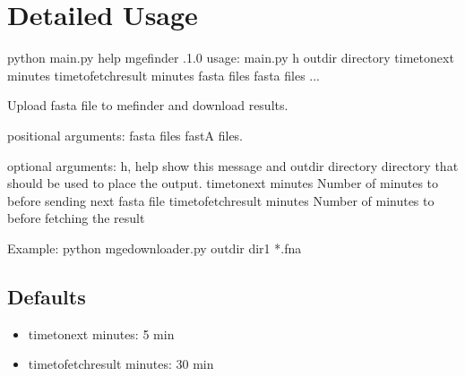 \documentclass[letterpaper,10pt,english]{sphinxmanual}
\begin{document}
\chapter{Detailed Usage}
\label{\detokenize{index:detailed-usage}}
\begin{sphinxVerbatim}[commandchars=\\\{\}]
\PYGZdl{} python main.py \PYGZhy{}\PYGZhy{}help
 mgefinder .1.0 
usage: main.py \PYG{o}{[}\PYGZhy{}h\PYG{o}{]} \PYGZhy{}\PYGZhy{}outdir directory \PYG{o}{[}\PYGZhy{}\PYGZhy{}time\PYGZhy{}to\PYGZhy{}next minutes\PYG{o}{]} \PYG{o}{[}\PYGZhy{}\PYGZhy{}time\PYGZhy{}to\PYGZhy{}fetch\PYGZhy{}result minutes\PYG{o}{]} fasta files \PYG{o}{[}fasta files ...\PYG{o}{]}

Upload fasta file to mefinder and download results.

positional arguments:
  fasta files         fastA files.

optional arguments:
  \PYGZhy{}h, \PYGZhy{}\PYGZhy{}help            show this  message and 
  \PYGZhy{}\PYGZhy{}outdir directory    directory that should be used to place the output.
  \PYGZhy{}\PYGZhy{}time\PYGZhy{}to\PYGZhy{}next minutes
                        Number of minutes to  before sending next fasta file
  \PYGZhy{}\PYGZhy{}time\PYGZhy{}to\PYGZhy{}fetch\PYGZhy{}result minutes
                        Number of minutes to  before fetching the result

Example: python mge\PYGZus{}downloader.py \PYGZhy{}\PYGZhy{}outdir dir1 *.fna
\end{sphinxVerbatim}


\section{Defaults}
\label{\detokenize{index:defaults}}\begin{itemize}
\item {} 
\textendash{}time\sphinxhyphen{}to\sphinxhyphen{}next minutes: 5 min

\item {} 
\textendash{}time\sphinxhyphen{}to\sphinxhyphen{}fetch\sphinxhyphen{}result minutes: 30 min

\end{itemize}
\end{document}
